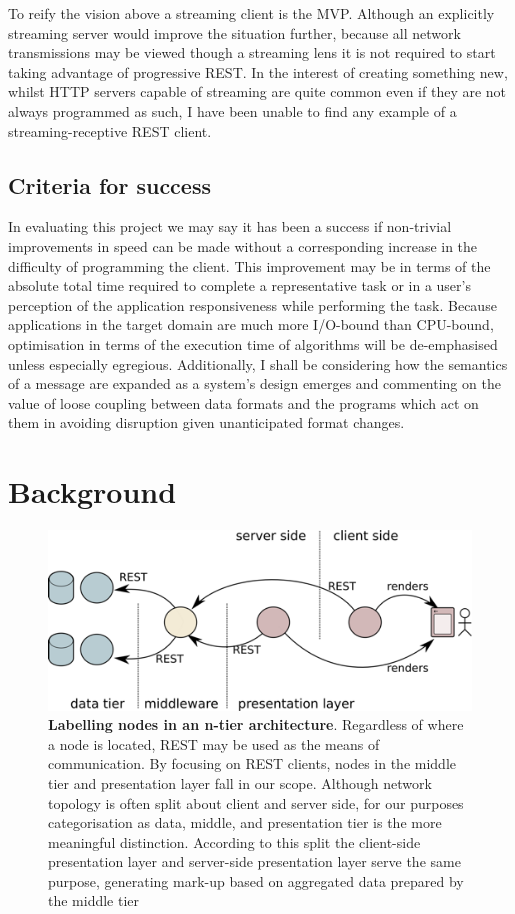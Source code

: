 \documentclass[12pt, ]{article}
\makeatletter
\let\stdsection\section
\renewcommand\section{\newpage\stdsection}
\def\maxwidth{\ifdim\Gin@nat@width>\linewidth\linewidth
\else\Gin@nat@width\fi}
\let\Oldincludegraphics\includegraphics
\renewcommand{\includegraphics}[1]{\Oldincludegraphics[width=\maxwidth]{#1}}
\makeatother
\begin{document}
To reify the vision above a streaming client is the MVP. Although an
explicitly streaming server would improve the situation further, because
all network transmissions may be viewed though a streaming lens it is
not required to start taking advantage of progressive REST. In the
interest of creating something new, whilst HTTP servers capable of
streaming are quite common even if they are not always programmed as
such, I have been unable to find any example of a streaming-receptive
REST client.

\subsection{Criteria for success}\label{criteria-for-success}

In evaluating this project we may say it has been a success if
non-trivial improvements in speed can be made without a corresponding
increase in the difficulty of programming the client. This improvement
may be in terms of the absolute total time required to complete a
representative task or in a user's perception of the application
responsiveness while performing the task. Because applications in the
target domain are much more I/O-bound than CPU-bound, optimisation in
terms of the execution time of algorithms will be de-emphasised unless
especially egregious. Additionally, I shall be considering how the
semantics of a message are expanded as a system's design emerges and
commenting on the value of loose coupling between data formats and the
programs which act on them in avoiding disruption given unanticipated
format changes.

\section{Background}\label{background}

\begin{figure}[htbp]
\centering
\includegraphics{images/architecture.png}
\caption{\textbf{Labelling nodes in an n-tier architecture}. Regardless
of where a node is located, REST may be used as the means of
communication. By focusing on REST clients, nodes in the middle tier and
presentation layer fall in our scope. Although network topology is often
split about client and server side, for our purposes categorisation as
data, middle, and presentation tier is the more meaningful distinction.
According to this split the client-side presentation layer and
server-side presentation layer serve the same purpose, generating
mark-up based on aggregated data prepared by the middle tier
\label{architecture}}
\end{figure}
\end{document}
